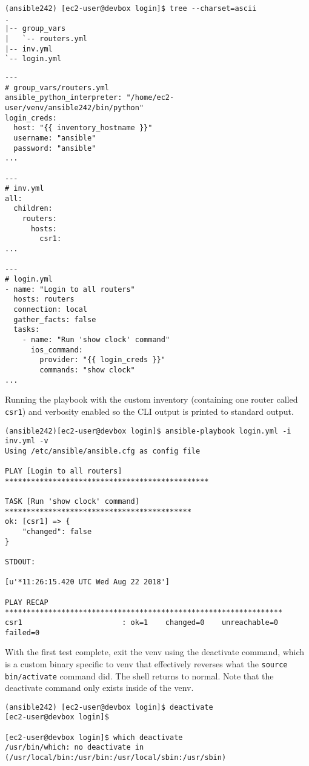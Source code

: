\begin{verbatim}
(ansible242) [ec2-user@devbox login]$ tree --charset=ascii
.
|-- group_vars
|   `-- routers.yml
|-- inv.yml
`-- login.yml
\end{verbatim}

\begin{verbatim}
---
# group_vars/routers.yml
ansible_python_interpreter: "/home/ec2-user/venv/ansible242/bin/python"
login_creds:
  host: "{{ inventory_hostname }}"
  username: "ansible"
  password: "ansible"
...

---
# inv.yml
all:
  children:
    routers:
      hosts:
        csr1:
...

---
# login.yml
- name: "Login to all routers"
  hosts: routers
  connection: local
  gather_facts: false
  tasks:
    - name: "Run 'show clock' command"
      ios_command:
        provider: "{{ login_creds }}"
        commands: "show clock"
...
\end{verbatim}

Running the playbook with the custom inventory (containing one router called
\verb|csr1|) and verbosity enabled so the CLI output is printed to standard
output.

\begin{verbatim}
(ansible242)[ec2-user@devbox login]$ ansible-playbook login.yml -i inv.yml -v
Using /etc/ansible/ansible.cfg as config file

PLAY [Login to all routers] ***********************************************

TASK [Run 'show clock' command] *******************************************
ok: [csr1] => {
    "changed": false
}

STDOUT:

[u'*11:26:15.420 UTC Wed Aug 22 2018']

PLAY RECAP ****************************************************************
csr1                       : ok=1    changed=0    unreachable=0    failed=0
\end{verbatim}

With the first test complete, exit the venv using the deactivate command,
which is a custom binary specific to venv that effectively reverses what the
\verb|source bin/activate| command did. The shell returns to normal. Note that
the deactivate command only exists inside of the venv.

\begin{verbatim}
(ansible242) [ec2-user@devbox login]$ deactivate
[ec2-user@devbox login]$

[ec2-user@devbox login]$ which deactivate
/usr/bin/which: no deactivate in (/usr/local/bin:/usr/bin:/usr/local/sbin:/usr/sbin)
\end{verbatim}

